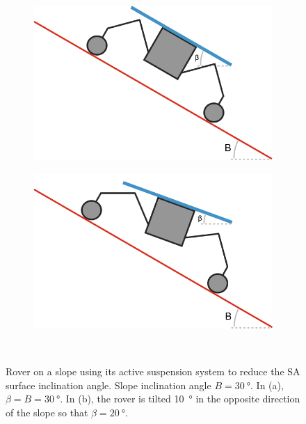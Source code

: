 \begin{figure}[h]
\captionsetup[subfigure]{justification=centering}
\vspace{-2ex}
	\centering
    \setlength{\subfigureWidth}{0.50\textwidth}
    \setlength{\graphicsHeight}{40mm}
    \hypersetup{hidelinks=true}%
    \begin{subfigure}[t]{\subfigureWidth}
        \centering
        \includegraphics[height=\graphicsHeight]{sections/mars-solar-energy/mission-sites/images/stick-rover-beta-large.png}
        \label{fig:sub:rover-on-slope-beta-large}
    \end{subfigure}\hfill
    \begin{subfigure}[t]{\subfigureWidth}
        \centering
        \includegraphics[height=\graphicsHeight]{sections/mars-solar-energy/mission-sites/images/stick-rover-beta-small.png}
		\label{fig:sub:rover-on-slope-beta-small}
	\end{subfigure}\\[0.8ex]
    \caption[Rover on a slope using its active suspension system to reduce the \ac{SA} surface inclination angle]
            {Rover on a slope using its active suspension system to reduce the \ac{SA} surface inclination angle. Slope inclination angle $B = \SI{30}{\degree}$. In (a), $\beta = B = \SI{30}{\degree}$. In (b), the rover is tilted  \SI{10}{\degree} in the opposite direction of the slope so that $\beta = \SI{20}{\degree}$.}
    \label{fig:sub:rover-on-slope-beta}
\vspace{-2ex}
\end{figure}

